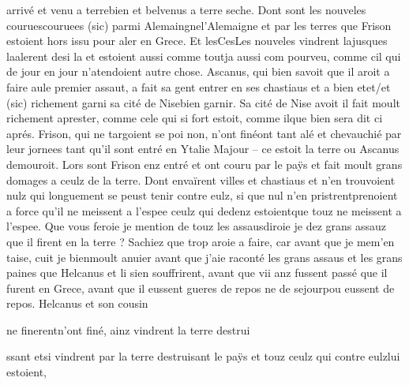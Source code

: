 \documentclass{article}
\begin{document}
\begin{pages}
                  arrivé 
                        et venu a terrebien et belvenus a terre seche. \pend
            \pstart Dont sont 
                  les nouveles 
                  couruescouruees (sic) parmi 
                     Alemaingnel'Alemaigne et par les terres que Frison estoient hors issu pour aler en Grece. 
                  Et lesCesLes nouveles 
                  vindrent 
                        lajusques laalerent desi la et estoient 
                  aussi comme toutja aussi com pourveu, comme cil qui de jour en jour n’atendoient autre chose. Ascanus, qui bien savoit que il aroit 
                  a faire aule premier assaut, a fait sa gent entrer en ses chastiaus et 
                  a bien 
                        etet/et (sic) richement garni sa cité de Nisebien garnir. Sa cité de Nise avoit il fait moult richement
                     aprester, comme cele qui si fort estoit, 
                     comme ilque bien sera dit ci aprés.
               Frison, qui ne targoient se poi non, 
                  n’ont finéont tant alé et chevauchié par leur jornees 
                  tant qu’il sont entré en Ytalie Majour – ce
               estoit la terre ou Ascanus demouroit. Lors sont
                  Frison enz entré et ont couru par le paÿs et fait moult grans domages a ceulz
               de la terre. Dont envaïrent villes et chastiaus 
                  et n’en trouvoient nulz qui longuement se peust tenir contre eulz, si que nul
               n’en 
                  pristrentprenoient a force 
                  qu’il ne meissent a l’espee ceulz qui dedenz estoientque touz ne meissent a l'espee. Que vous 
                     feroie je mention de touz les assausdiroie je dez grans assauz que il firent en la terre ? Sachiez que trop aroie a faire, car avant que
                  je 
                     mem'en taise, cuit je 
                     bienmoult anuier avant que j’aie raconté les grans assaus 
                     et les grans paines que Helcanus et li sien
               souffrirent, avant que vii anz fussent passé que il furent en Grece, avant que 
                  il eussent gueres de repos ne de sejourpou eussent de repos. \pend
            \pstart Helcanus et son cousin
               
                  ne finerentn'ont finé, 
                  ainz vindrent la terre destrui
                        
                        ssant etsi vindrent par la terre destruisant le paÿs et touz ceulz qui contre 
                  eulzlui estoient, 
                  

\end{pages}
\end{document}
